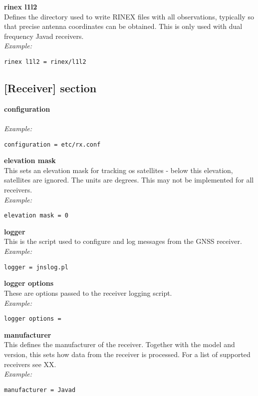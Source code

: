 {\bfseries rinex l1l2}\\ \hypertarget{h:rinex_l1l2}{}
Defines the directory used to write RINEX files with all observations, typically so that precise antenna coordinates
can be obtained. This is only used with dual frequency Javad receivers.\\
\textit{Example:}
\begin{lstlisting}
rinex l1l2 = rinex/l1l2
\end{lstlisting}


\subsection{[Receiver] section \label{sgcreceiver}}

\hypertarget{h:receiver}{}

{\bfseries configuration}\\
\\
\textit{Example:}
\begin{lstlisting}
configuration = etc/rx.conf
\end{lstlisting}

{\bfseries elevation mask}\\
This sets an elevation mask for tracking os satellites - below this elevation, satellites
are ignored. The units are degrees. This may not be implemented for all receivers.\\
\textit{Example:}
\begin{lstlisting}
elevation mask = 0
\end{lstlisting}

{\bfseries logger}\\
This is the script used to configure and log messages from the GNSS receiver.\\
\textit{Example:}
\begin{lstlisting}
logger = jnslog.pl
\end{lstlisting}

{\bfseries logger options}\\
These are options passed to the receiver logging script.\\
\textit{Example:}
\begin{lstlisting}
logger options =
\end{lstlisting}

{\bfseries manufacturer}\\
This defines the manufacturer of the receiver. Together with the model and version, 
this sets how data from the receiver is processed. For a list of supported receivers
see XX.\\
\textit{Example:}
\begin{lstlisting}
manufacturer = Javad
\end{lstlisting}


